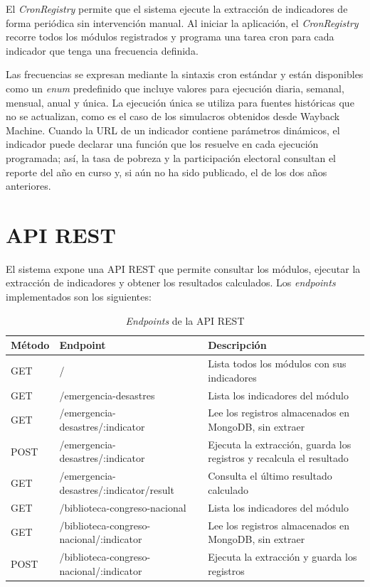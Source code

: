 \documentclass[12pt,letterpaper,oneside]{report}
\begin{document}
El \textit{CronRegistry} permite que el sistema ejecute la extracci\'on de indicadores de forma peri\'odica sin intervenci\'on manual. Al iniciar la aplicaci\'on, el \textit{CronRegistry} recorre todos los m\'odulos registrados y programa una tarea cron para cada indicador que tenga una frecuencia definida.

Las frecuencias se expresan mediante la sintaxis cron est\'andar y est\'an disponibles como un \textit{enum} predefinido que incluye valores para ejecuci\'on diaria, semanal, mensual, anual y \'unica. La ejecuci\'on \'unica se utiliza para fuentes hist\'oricas que no se actualizan, como es el caso de los simulacros obtenidos desde Wayback Machine. Cuando la URL de un indicador contiene par\'ametros din\'amicos, el indicador puede declarar una funci\'on que los resuelve en cada ejecuci\'on programada; as\'i, la tasa de pobreza y la participaci\'on electoral consultan el reporte del a\~no en curso y, si a\'un no ha sido publicado, el de los dos a\~nos anteriores.

\section{API REST}
\label{sec:api-rest}

El sistema expone una API REST que permite consultar los m\'odulos, ejecutar la extracci\'on de indicadores y obtener los resultados calculados. Los \textit{endpoints} implementados son los siguientes:

\begin{table}[H]
\centering
\caption{\textit{Endpoints} de la API REST}
\label{tab:endpoints}
\small
\begin{tabular}{|l|>{\ttfamily\raggedright\arraybackslash}p{6.2cm}|p{4.6cm}|}
\hline
\textbf{M\'etodo} & \textnormal{\textbf{Endpoint}} & \textbf{Descripci\'on} \\
\hline
GET & / & Lista todos los m\'odulos con sus indicadores \\
\hline
GET & /emergencia-desastres & Lista los indicadores del m\'odulo \\
\hline
GET & /emergencia-desastres/\allowbreak :indicator & Lee los registros almacenados en MongoDB, sin extraer \\
\hline
POST & /emergencia-desastres/\allowbreak :indicator & Ejecuta la extracci\'on, guarda los registros y recalcula el resultado \\
\hline
GET & /emergencia-desastres/\allowbreak :indicator/\allowbreak result & Consulta el \'ultimo resultado calculado \\
\hline
GET & /biblioteca-congreso-nacional & Lista los indicadores del m\'odulo \\
\hline
GET & /biblioteca-congreso-nacional/\allowbreak :indicator & Lee los registros almacenados en MongoDB, sin extraer \\
\hline
POST & /biblioteca-congreso-nacional/\allowbreak :indicator & Ejecuta la extracci\'on y guarda los registros \\
\hline
\end{tabular}
\end{table}
\end{document}
